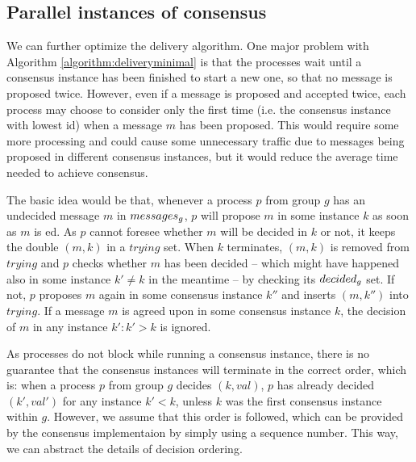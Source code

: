 \documentclass[times, 10pt]{article}
\begin{document}
\subsection{Parallel instances of consensus}
\label{sec:parallel}

We can further optimize the delivery algorithm. One major problem with Algorithm \ref{algorithm:deliveryminimal} is that the processes wait until a consensus instance has been finished to start a new one, so that no message is proposed twice. However, even if a message is proposed and accepted twice, each process may choose to consider only the first time (i.e. the consensus instance with lowest id) when a message $m$ has been proposed. This would require some more processing and could cause some unnecessary traffic due to messages being proposed in different consensus instances, but it would reduce the average time needed to achieve consensus. %

The basic idea would be that, whenever a process $p$ from group $g$ has an undecided message $m$ in $messages\text{$_g$}$, $p$ will propose $m$ in some instance $k$ as soon as $m$ is \rmdel{}ed. As $p$ cannot foresee whether $m$ will be decided in $k$ or not, it keeps the double $(m,k)$ in a $trying$ set. When $k$ terminates, $(m,k)$ is removed from $trying$ and $p$ checks whether $m$ has been decided -- which might have happened also in some instance $k' \neq k$ in the meantime -- by checking its $decided\text{$_g$}$ set. If not, $p$ proposes $m$ again in some consensus instance $k''$ and inserts $(m,k'')$ into $trying$. If a message $m$ is agreed upon in some consensus instance $k$, the decision of $m$ in any instance \mbox{$k' : k' > k$} is ignored.

As processes do not block while running a consensus instance, there is no guarantee that the consensus instances will terminate in the correct order, which is: when a process $p$ from group $g$ decides $(k, val)$, $p$ has already decided $(k',val')$ for any instance $k' < k$, unless $k$ was the first consensus instance within $g$. However, we assume that this order is followed, which can be provided by the consensus implementaion by simply using a sequence number. This way, we can abstract the details of decision ordering.
\end{document}
